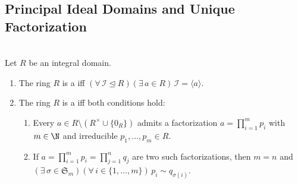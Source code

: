 \subsection{Principal Ideal Domains and Unique Factorization}

\begin{definition} \label{def:principal-ideal-domain-and-ufd} \\
Let $R$ be an integral domain.
\begin{enumerate}[label=(\roman*)]
\setlength{\itemsep}{0pt}
\item The ring $R$ is a  iff $(\forall\,\mathcal{I}\trianglelefteq R)(\exists\,a\in R)\,\mathcal{I}=\langle a\rangle$.
\item The ring $R$ is a  iff both conditions hold:
\begin{enumerate}[label=(\alph*)]
\setlength{\itemsep}{0pt}
\item Every $a\in R\setminus(R^\times\cup\{0_R\})$ admits a factorization $a=\prod\limits_{i=1}^{m}p_i$ with $m\in\N$ and irreducible $p_1,\ldots,p_m\in R$.
\item If $a=\prod\limits_{i=1}^{m}p_i=\prod\limits_{j=1}^{n}q_j$ are two such factorizations, then $m=n$ and $(\exists\,\sigma\in\mathfrak{S}_m)(\forall\,i\in\{1,\ldots,m\})\,p_i\sim q_{\sigma(i)}$.
\end{enumerate}
\end{enumerate}
\end{definition}

